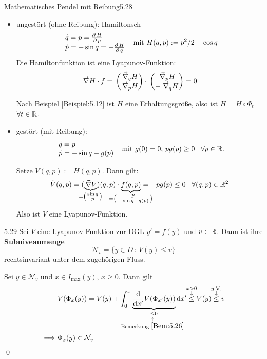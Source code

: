 \documentclass[a4paper]{article}
\begin{document}
\begin{Beispiel}{Mathematisches Pendel mit Reibung}{5.28}
\begin{itemize}
\item ungestört (ohne Reibung): Hamiltonsch
\[
\begin{array}{l}
\dot{q}=p=\frac{\pp H}{\pp p}\\
\dot{p}=-\sin q=-\frac{\pp H}{\pp q}
\end{array}
\te{ mit }H(q,p):=p^2/2-\cos q
\]
Die Hamiltonfunktion ist eine Lyapunov-Funktion:
\[\mathop{}\Vec{\nabla} H\cdot f=\mathop{}\begin{pmatrix}\mathop{}\Vec{\nabla}_q H\\\mathop{}\Vec{\nabla}_p H\end{pmatrix}\cdot\mathop{}\begin{pmatrix}\mathop{}\Vec{\nabla}_p H\\-\mathop{}\Vec{\nabla}_qH\end{pmatrix}=0\]

Nach Beispiel \ref{Beispiel:5.12} ist $H$ eine Erhaltungsgröße, also ist $H=H\circ \Phi_t$ $\forall t\in\mathbb R$.
\item gestört (mit Reibung):
\[
\begin{array}{l}
\dot{q}=p\\
\dot{p}=-\sin q-g(p)
\end{array}
\te{ mit  $g(0)=0$, $pg(p)\ge 0 \;\;\;\forall p\in\RR$.}
\]

Setze $V(q,p):=H(q,p)$. Dann gilt:
\[\dot{V}(q,p)=(\underbrace{\nn V}_{\mathclap{=\left(\begin{smallmatrix}\sin q\\p\end{smallmatrix}\right)}})(q,p)\cdot \underbrace{f(q,p)}_{\mathclap{=\left(\begin{smallmatrix}p\\-\sin q-g(p)\end{smallmatrix}\right)}}=-pg(p)\le 0\;\;\;\forall (q,p)\in\RR^2\]
Also ist $V$ eine Lyapunov-Funktion.
\end{itemize}
\end{Beispiel}

\begin{Satz}{}{5.29}
Sei $V$ eine Lyapunov-Funktion zur DGL $y'=f(y)$ und $v\in \mathbb R$. Dann ist ihre \textbf{Subniveaumenge}
\[\mathcal{N}_v=\{y\in D\,:\, V(y)\le v\}\]
rechtsinvariant unter dem zugehörigen Fluss.
\end{Satz}

\begin{Beweis}
Sei $y\in \mathcal{N}_v$ und $x\in I_{\max}(y)$, $x\ge0$. Dann gilt
\begin{align*}
&V(\Phi_x(y))=V(y)+\int_0^x\underbrace{\frac{\dd}{\dd x'}V(\Phi_{x'}(y))}_{
\underset{\mathclap{\substack{\uparrow\\\text{Bemerkung }\ref{Bem:5.26}}}}{\le }0}
\dd x'
\overset{\mathclap{\substack{x>0\\\downarrow}}}{\le }V(y)
\overset{\ms{\text{n.V.}\\\downarrow}}{\le} v\\
\implies& \Phi_x(y)\in \mathcal{N}_v
\end{align*}
\qed
\end{Beweis}
\end{document}
